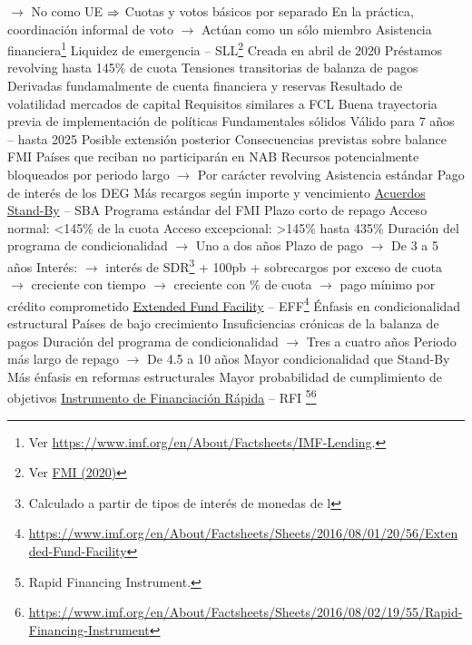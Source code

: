 \documentclass{nuevotema}
\begin{document}
\begin{esquemal}
				\4[] $\to$ No como UE
				\4[] $\Rightarrow$ Cuotas y votos básicos por separado
				\4[] En la práctica, coordinación informal de voto
				\4[] $\to$ Actúan como un sólo miembro
	\1 
		\2 Asistencia financiera\footnote{Ver \url{https://www.imf.org/en/About/Factsheets/IMF-Lending}.}
			\3 Liquidez de emergencia -- SLL\footnote{Ver \href{https://www.imf.org/en/News/Articles/2020/04/21/pr20180-imf-executive-board-covid-19-response-new-sll-enhance-adequacy-global-financial-safety-net}{FMI (2020)}}
				\4 Creada en abril de 2020
				\4 Préstamos revolving hasta 145\% de cuota
				\4 Tensiones transitorias de balanza de pagos
				\4[] Derivadas fundamalmente de cuenta financiera y reservas
				\4[] Resultado de volatilidad mercados de capital
				\4 Requisitos similares a FCL
				\4[] Buena trayectoria previa de implementación de políticas
				\4[] Fundamentales sólidos
				\4 Válido para 7 años -- hasta 2025
				\4[] Posible extensión posterior
				\4 Consecuencias previstas sobre balance FMI
				\4[] Países que reciban no participarán en NAB
				\4[] Recursos potencialmente bloqueados por periodo largo
				\4[] $\to$ Por carácter revolving
			\3 Asistencia estándar
				\4 Pago de interés de los DEG
				\4[] Más recargos según importe y vencimiento
				\4 \underline{Acuerdos Stand-By} -- SBA
				\4[] Programa estándar del FMI
				\4[] Plazo corto de repago
				\4[] Acceso normal: <145\% de la cuota
				\4[] Acceso excepcional: >145\% hasta 435\%
				\4[] Duración del programa de condicionalidad
				\4[] $\to$ Uno a dos años
				\4[] Plazo de pago
				\4[] $\to$ De 3 a 5 años
				\4[] Interés:
				\4[] $\to$ interés de SDR\footnote{Calculado a partir de tipos de interés de monedas de l} + 100pb + sobrecargos por exceso de cuota
				\4[] $\to$ creciente con tiempo
				\4[] $\to$ creciente con \% de cuota
				\4[] $\to$ pago mínimo por crédito comprometido
				\4 \underline{Extended Fund Facility} -- EFF\footnote{\url{https://www.imf.org/en/About/Factsheets/Sheets/2016/08/01/20/56/Extended-Fund-Facility}}
				\4[] Énfasis en condicionalidad estructural
				\4[] Países de bajo crecimiento
				\4[] Insuficiencias crónicas de la balanza de pagos
				\4[] Duración del programa de condicionalidad
				\4[] $\to$ Tres a cuatro años
				\4[] Periodo más largo de repago
				\4[] $\to$ De 4.5 a 10 años
				\4[] Mayor condicionalidad que Stand-By
				\4[] Más énfasis en reformas estructurales
				\4[] Mayor probabilidad de cumplimiento de objetivos
				\4 \underline{Instrumento de Financiación Rápida} -- RFI \footnote{Rapid Financing Instrument.}\footnote{\url{https://www.imf.org/en/About/Factsheets/Sheets/2016/08/02/19/55/Rapid-Financing-Instrument}}

\end{esquemal}
\end{document}
